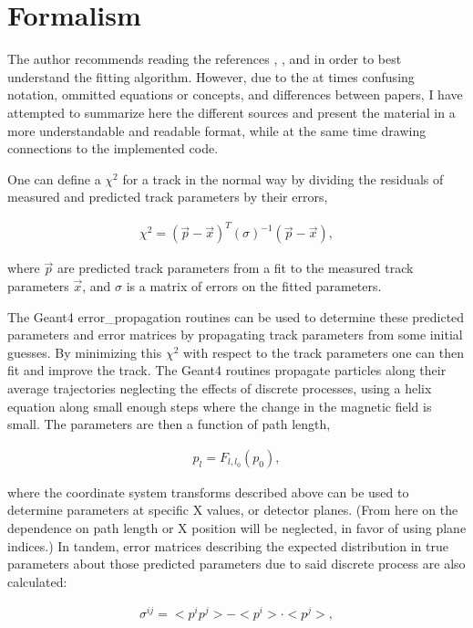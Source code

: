 \section{Formalism}

    The author recommends reading the references \cite{geanemanual}, \cite{trajfit}, and \cite{Lavezzi} in order to best understand the fitting algorithm. However, due to the at times confusing notation, ommitted equations or concepts, and differences between papers, I have attempted to summarize here the different sources and present the material in a more understandable and readable format, while at the same time drawing connections to the implemented code.

    One can define a $\chi^{2}$ for a track in the normal way by dividing the residuals of measured and predicted track parameters by their errors,

\begin{align} \label{eq:chi2}
\chi^2 = (\vec{p}-\vec{x})^{T} (\sigma)^{-1} (\vec{p}-\vec{x}),
\end{align}

    where $\vec{p}$ are predicted track parameters from a fit to the measured track parameters $\vec{x}$, and $\sigma$ is a matrix of errors on the fitted parameters.

    The Geant4 error\_propagation routines can be used to determine these predicted parameters and error matrices by propagating track parameters from some initial guesses. By minimizing this $\chi^{2}$ with respect to the track parameters one can then fit and improve the track. The Geant4 routines propagate particles along their average trajectories neglecting the effects of discrete processes, using a helix equation along small enough steps where the change in the magnetic field is small. The parameters are then a function of path length, 

\begin{align} \label{eq:pp}
p_{l} = F_{l,l_{0}}(p_{0}),
\end{align}

    where the coordinate system transforms described above can be used to determine parameters at specific X values, or detector planes. (From here on the dependence on path length or X position will be neglected, in favor of using plane indices.) In tandem, error matrices describing the expected distribution in true parameters about those predicted parameters due to said discrete process are also calculated:

\begin{align} \label{eq:sigma}
\sigma^{ij} = <p^{i}p^{j}> - <p^{i}> \cdot <p^{j}>,
\end{align} 

